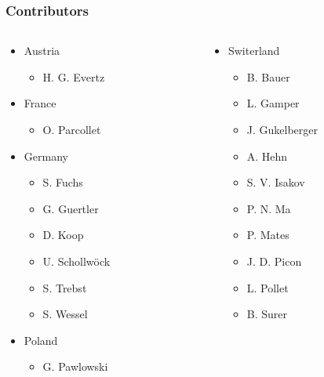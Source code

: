 \begin{frame}
  \frametitle{Contributors}
  \begin{columns}[T]
    \begin{column}{.33\textwidth}
      \begin{itemize}
      \item Austria
        \begin{itemize}
        \item H. G. Evertz
        \end{itemize}
      \item France
        \begin{itemize}
        \item O. Parcollet
        \end{itemize}
      \item Germany
        \begin{itemize}
        \item S. Fuchs
        \item G. Guertler
        \item D. Koop
        \item U. Schollw\"ock
        \item S. Trebst
        \item S. Wessel
        \end{itemize}
      \item Poland
        \begin{itemize}
        \item G. Pawlowski
        \end{itemize}
      \end{itemize}
    \end{column}
    \begin{column}{.31\textwidth}
      \begin{itemize}
      \item Switerland
        \begin{itemize}
        \item B. Bauer
        \item L. Gamper
        \item J. Gukelberger
        \item A. Hehn
        \item S. V. Isakov
        \item P. N. Ma
        \item P. Mates
        \item J. D. Picon
        \item L. Pollet
        \item B. Surer

\end{itemize}
\end{itemize}
\end{column}
\end{columns}
\end{frame}
